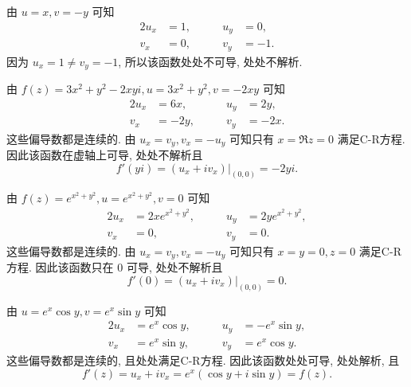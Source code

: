 \begin{solution}\delspace
  \begin{enumnopar}[(i)]
    \item 由 $u=x,v=-y$ 可知
      \begin{alignat*}{2}
        u_x&=1,\qquad&u_y&=0,\\
        v_x&=0,\qquad&v_y&=-1.
      \end{alignat*}
      因为 $u_x=1\neq v_y=-1$, 所以该函数处处不可导, 处处不解析.
    \item 由 $f(z)=3x^2+y^2-2xyi,u=3x^2+y^2,v=-2xy$ 可知
      \begin{alignat*}{2}
        u_x&=6x,\qquad&u_y&=2y,\\
        v_x&=-2y, \qquad&v_y&=-2x.
      \end{alignat*}
      这些偏导数都是连续的.
      由 $u_x=v_y,v_x=-u_y$ 可知只有 $x=\Re z=0$ 满足C-R方程.
      因此该函数在虚轴上可导, 处处不解析且
      \[
        f'(yi)=(u_x+iv_x)|_{(0,0)}=-2yi.
      \]
    \item 由 $f(z)=e^{x^2+y^2},u=e^{x^2+y^2},v=0$ 可知
      \begin{alignat*}{2}
        u_x&=2xe^{x^2+y^2},\qquad&u_y&=2ye^{x^2+y^2},\\
        v_x&=0, \qquad&v_y&=0.
      \end{alignat*}
      这些偏导数都是连续的.
      由 $u_x=v_y,v_x=-u_y$ 可知只有 $x=y=0,z=0$ 满足C-R方程.
      因此该函数只在 $0$ 可导, 处处不解析且
      \[
        f'(0)=(u_x+iv_x)|_{(0,0)}=0.
      \]
    \item 由 $u=e^x\cos y,v=e^x\sin y$ 可知
      \begin{alignat*}{2}
        u_x&=e^x\cos y,\qquad&u_y&=-e^x\sin y,\\
        v_x&=e^x\sin y,\qquad&v_y&=e^x\cos y.
      \end{alignat*}
      这些偏导数都是连续的, 且处处满足C-R方程.
      因此该函数处处可导, 处处解析, 且
      \[
        f'(z)=u_x+iv_x=e^x(\cos y+i\sin y)=f(z).
      \]
  \end{enumnopar}
\end{solution}

